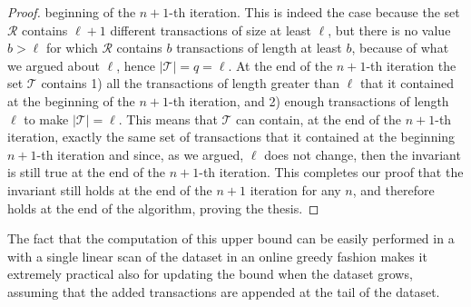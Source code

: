 \begin{proof}
  beginning of the $n+1$-th iteration. This is indeed the case because the set $\mathcal{R}$ 
  contains $\ell+1$ different transactions of size at least $\ell$, but there is
  no value $b>\ell$ for which $\mathcal{R}$ contains $b$ transactions of length
  at least $b$, because of what we argued about $\ell$, hence
  $|\mathcal{T}|=q=\ell$. At the end of the $n+1$-th iteration the set
  $\mathcal{T}$ contains 1) all the transactions of length greater than $\ell$ that
  it contained at the beginning of the $n+1$-th iteration, and 2) enough transactions of
  length $\ell$ to make $|\mathcal{T}|=\ell$. This means that $\mathcal{T}$ can
  contain, at the end of the $n+1$-th iteration, exactly the same set of
  transactions that it contained at the beginning $n+1$-th iteration and since, 
  as we argued, $\ell$ does not change, then the invariant is still true at the
  end of the $n+1$-th iteration. This completes our proof that the invariant
  still holds at the end of the $n+1$ iteration for any $n$, and therefore holds
  at the end of the algorithm, proving the thesis.
\end{proof}

The fact that the computation of this upper bound can be easily performed in a with a
single linear scan of the dataset in an online greedy fashion makes it extremely
practical also for updating the bound when the dataset grows, assuming that the
added transactions are appended at the tail of the dataset.

%

